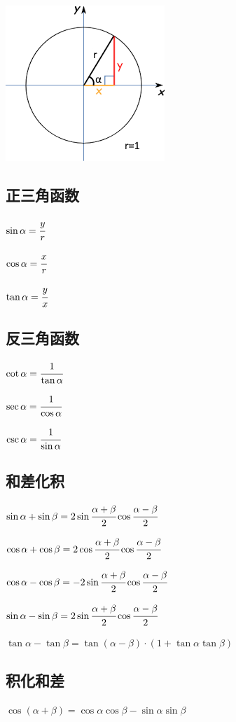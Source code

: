 \documentclass[UTF8,12pt]{ctexbook}
\begin{document}
{{\includegraphics{resources/UnitCircle.png}

\subsection{正三角函数}{
  $\sin{\alpha} = \cfrac{y}{r}$

  $\cos{\alpha} = \cfrac{x}{r}$

  $\tan{\alpha} = \cfrac{y}{x}$
}%

\subsection{反三角函数}{
  $\cot{\alpha} = \cfrac{1}{\tan{\alpha}}$

  $\sec{\alpha} = \cfrac{1}{\cos{\alpha}}$

  $\csc{\alpha} = \cfrac{1}{\sin{\alpha}}$
}%

\subsection{和差化积}{
  $\sin{\alpha}+\sin{\beta} = 2\sin{\cfrac{\alpha + \beta}{2}}\cos{\cfrac{\alpha - \beta}{2}}$

  $\cos{\alpha}+\cos{\beta} = 2\cos{\cfrac{\alpha + \beta}{2}\cos{\cfrac{\alpha-\beta}{2}}}$

  $\cos{\alpha}-\cos{\beta} = -2\sin{\cfrac{\alpha + \beta}{2}}\cos{\cfrac{\alpha - \beta}{2}}$

  $\sin{\alpha}-\sin{\beta} = 2\sin{\cfrac{\alpha + \beta}{2}}\cos{\cfrac{\alpha - \beta}{2}}$

  $\tan\alpha - \tan\beta = \tan(\alpha - \beta) \cdot (1 + \tan\alpha\tan\beta)$
}%

\subsection{积化和差}{
  $\cos(\alpha + \beta) = \cos{\alpha}\cos{\beta} - \sin{\alpha}\sin{\beta}$

}}}
\end{document}
